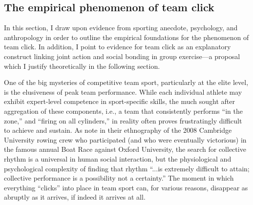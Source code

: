 \begin{CJK}{UTF8}{gbsn}



\section{The empirical phenomenon of team click \label{sect:teamClickEmpirical}}
In this section, I draw upon evidence from sporting anecdote, psychology, and anthropology in order to outline the empirical foundations for the phenomenon of team click.  In addition, I point to evidence for team click as an explanatory construct linking joint action and social bonding in group exercise---a proposal which I justify theoretically in the following section.

One of the big mysteries of competitive team sport, particularly at the elite level, is the elusiveness of peak team performance.  While each individual athlete may exhibit expert-level competence in sport-specific skills, the much sought after aggregation of these components, i.e., a team that consistently performs ``in the zone,'' and ``firing on all cylinders,'' in reality often proves frustratingly difficult to achieve and sustain.  As \textcite[568]{King2011} note in their ethnography of the 2008 Cambridge University rowing crew who participated (and who were eventually victorious) in the famous annual Boat Race against Oxford University, the search for collective rhythm is a universal in human social interaction, but  the physiological and psychological complexity of finding that rhythm ``...is extremely difficult to attain; collective performance is a possibility not a certainty.''   The moment in which everything ``clicks'' into place in team sport can, for various reasons, disappear as abruptly as it arrives, if indeed it arrives at all.


\end{CJK}

